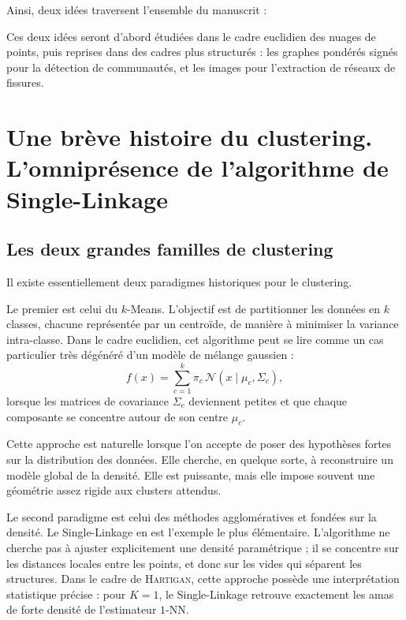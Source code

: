 Ainsi, deux idées traversent l'ensemble du manuscrit :

Ces deux idées seront d'abord étudiées dans le cadre euclidien des nuages de points, puis reprises dans des cadres plus structurés : les graphes pondérés signés pour la détection de communautés, et les images pour l'extraction de réseaux de fissures.

\section{Une brève histoire du clustering. L'omniprésence de l'algorithme de Single-Linkage}

\subsection{Les deux grandes familles de clustering}

Il existe essentiellement deux paradigmes historiques pour le clustering.

Le premier est celui du $k$-Means. L'objectif est de partitionner les données en $k$ classes, chacune représentée par un centroïde, de manière à minimiser la variance intra-classe. Dans le cadre euclidien, cet algorithme peut se lire comme un cas particulier très dégénéré d'un modèle de mélange gaussien :
\[
    f(x)
    =
    \sum_{c=1}^{k}
    \pi_c\,\mathcal{N}(x\mid \mu_c,\Sigma_c),
\]
lorsque les matrices de covariance $\Sigma_c$ deviennent petites et que chaque composante se concentre autour de son centre $\mu_c$.

Cette approche est naturelle lorsque l'on accepte de poser des hypothèses fortes sur la distribution des données. Elle cherche, en quelque sorte, à reconstruire un modèle global de la densité. Elle est puissante, mais elle impose souvent une géométrie assez rigide aux clusters attendus.

Le second paradigme est celui des méthodes agglomératives et fondées sur la densité. Le Single-Linkage en est l'exemple le plus élémentaire. L'algorithme ne cherche pas à ajuster explicitement une densité paramétrique ; il se concentre sur les distances locales entre les points, et donc sur les vides qui séparent les structures. Dans le cadre de \textsc{Hartigan}, cette approche possède une interprétation statistique précise : pour $K=1$, le Single-Linkage retrouve exactement les amas de forte densité de l'estimateur $1$-NN.

